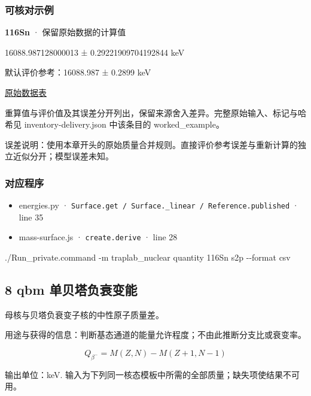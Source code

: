 \documentclass[
  11pt,
  letterpaper,
]{article}
\newenvironment{Shaded}{}{}
\newcommand{\AttributeTok}[1]{\textcolor[rgb]{0.49,0.56,0.16}{#1}}
\newcommand{\ExtensionTok}[1]{#1}
\newcommand{\NormalTok}[1]{#1}
\providecommand{\tightlist}{%
  \setlength{\itemsep}{0pt}\setlength{\parskip}{0pt}}
\begin{document}
\subsubsection{可核对示例}\label{ux53efux6838ux5bf9ux793aux4f8b-6}

\textbf{116Sn} · 保留原始数据的计算值

16088.987128000013 ± 0.29221909704192844 keV

默认评价参考：16088.987 ± 0.2899 keV

\href{https://www-nds.iaea.org/amdc/ame2020/rct1.mas20.txt}{原始数据表}

重算值与评价值及其误差分开列出，保留来源舍入差异。完整原始输入、标记与哈希见
inventory-delivery.json 中该条目的 worked\_example。

误差说明：使用本章开头的原始质量合并规则。直接评价参考误差与重新计算的独立近似分开；模型误差未知。

\subsubsection{对应程序}\label{ux5bf9ux5e94ux7a0bux5e8f-6}

\begin{itemize}
\tightlist
\item
  energies.py ·
  \texttt{Surface.get\ /\ Surface.\_linear\ /\ Reference.published} ·
  line 35
\item
  mass-surface.js · \texttt{create.derive} · line 28
\end{itemize}

\begin{Shaded}
\begin{Highlighting}[]
\ExtensionTok{./Run\_private.command} \AttributeTok{{-}m}\NormalTok{ traplab\_nuclear quantity 116Sn s2p }\AttributeTok{{-}{-}format}\NormalTok{ csv}
\end{Highlighting}
\end{Shaded}

\subsection{8 qbm
单贝塔负衰变能}\label{qbm-ux5355ux8d1dux5854ux8d1fux8870ux53d8ux80fd}

母核与贝塔负衰变子核的中性原子质量差。

用途与获得的信息：判断基态通道的能量允许程度；不由此推断分支比或衰变率。

\[
Q_{\beta^-}=M(Z,N)-M(Z+1,N-1)
\]

输出单位：keV.
输入为下列同一核态模板中所需的全部质量；缺失项使结果不可用。
\end{document}
